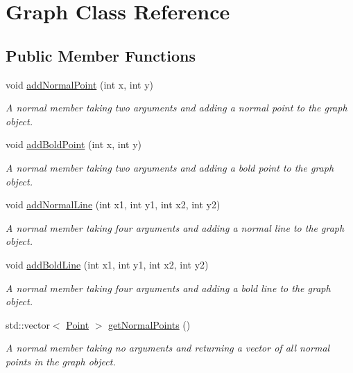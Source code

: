 \hypertarget{class_graph}{}\section{Graph Class Reference}
\label{class_graph}
\subsection*{Public Member Functions}
\begin{DoxyCompactItemize}
\item 
void \mbox{\hyperlink{class_graph_a69afbf431e87f7b164d69237e0e98d92}{add\+Normal\+Point}} (int x, int y)
\begin{DoxyCompactList}\small\item\em A normal member taking two arguments and adding a normal point to the graph object. \end{DoxyCompactList}\item 
void \mbox{\hyperlink{class_graph_a3086b8d5bc5e953c76a40b66e570c918}{add\+Bold\+Point}} (int x, int y)
\begin{DoxyCompactList}\small\item\em A normal member taking two arguments and adding a bold point to the graph object. \end{DoxyCompactList}\item 
void \mbox{\hyperlink{class_graph_a03f8219b2bbafa111811b6005210bd31}{add\+Normal\+Line}} (int x1, int y1, int x2, int y2)
\begin{DoxyCompactList}\small\item\em A normal member taking four arguments and adding a normal line to the graph object. \end{DoxyCompactList}\item 
void \mbox{\hyperlink{class_graph_abe207827bee7e2be2cbce4ed24a7d10d}{add\+Bold\+Line}} (int x1, int y1, int x2, int y2)
\begin{DoxyCompactList}\small\item\em A normal member taking four arguments and adding a bold line to the graph object. \end{DoxyCompactList}\item 
std\+::vector$<$ \mbox{\hyperlink{struct_point}{Point}} $>$ \mbox{\hyperlink{class_graph_aec8ff38cf9e5628827899cc1eee5c9b3}{get\+Normal\+Points}} ()
\begin{DoxyCompactList}\small\item\em A normal member taking no arguments and returning a vector of all normal points in the graph object. \end{DoxyCompactList}\item 

\end{DoxyCompactItemize}
